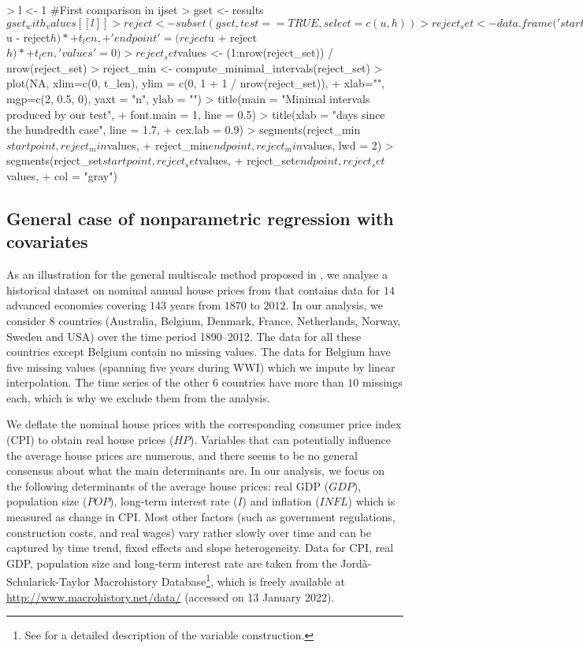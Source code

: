 \documentclass[a4paper]{article}
\begin{document}
\begin{Schunk}
\begin{Sinput}
> l <- 1 #First comparison in ijset
> gset       <- results$gset_with_values[[l]]
> reject     <- subset(gset, test == TRUE, select = c(u, h))
> reject_set <- data.frame('startpoint' = (reject$u - reject$h) *
+                            t_len,
+                          'endpoint' = (reject$u + reject$h) *
+                            t_len, 'values' = 0)
> reject_set$values <- (1:nrow(reject_set)) / nrow(reject_set)
> reject_min        <- compute_minimal_intervals(reject_set)
> plot(NA, xlim=c(0, t_len),  ylim = c(0, 1 + 1 / nrow(reject_set)),
+      xlab="", mgp=c(2, 0.5, 0), yaxt = "n", ylab = "")
> title(main = "Minimal intervals produced by our test",
+       font.main = 1, line = 0.5)
> title(xlab = "days since the hundredth case", line = 1.7,
+       cex.lab = 0.9)
> segments(reject_min$startpoint, reject_min$values,
+          reject_min$endpoint, reject_min$values, lwd = 2)
> segments(reject_set$startpoint, reject_set$values,
+          reject_set$endpoint, reject_set$values,
+          col = "gray")
\end{Sinput}
\end{Schunk}

\subsection{General case of nonparametric regression with covariates}
As an illustration for the general multiscale method proposed in \cite{KhismatullinaVogt2022}, we analyse a historical dataset on nominal annual house prices from \cite{Knoll2017} that contains data for $14$ advanced economies covering $143$ years from $1870$ to $2012$. In our analysis, we consider 8 countries (Australia, Belgium, Denmark, France, Netherlands, Norway, Sweden and USA) over the time period 1890--2012. The data for all these countries except Belgium contain no missing values. The data for Belgium have five missing values (spanning five years during WWI) which we impute by linear interpolation. The time series of the other $6$ countries have more than $10$ missings each, which is why we exclude them from the analysis.

We deflate the nominal house prices with the corresponding consumer price index (CPI) to obtain real house prices ($HP$). Variables that can potentially influence the average house prices are numerous, and there seems to be no general consensus about what the main determinants are. In our analysis, we focus on the following determinants of the average house prices: real GDP ($GDP$), population size ($POP$), long-term interest rate ($I$) and inflation ($INFL$) which is measured as change in CPI. Most other factors (such as government regulations, construction costs, and real wages) vary rather slowly over time and can be captured by time trend, fixed effects and slope heterogeneity.
Data for CPI, real GDP, population size and long-term interest rate are taken from the Jordà-Schularick-Taylor Macrohistory Database\footnote{See \cite{Jorda2017} for a detailed description of the variable construction.}, which is freely available at \url{http://www.macrohistory.net/data/} (accessed on 13 January 2022).
\end{document}
